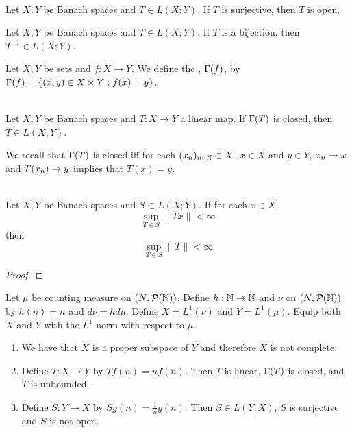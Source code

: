 \documentclass{book}
\begin{document}
	
	\begin{thm}  \\
		Let $X, Y$ be Banach spaces and $T\in L(X; Y)$. If $T$ is surjective, then $T$ is open.
	\end{thm}
	
	\begin{cor}
		Let $X, Y$ be Banach spaces and $T \in L(X; Y)$. If $T$ is a bijection, then $T^{-1} \in L(X; Y)$.
	\end{cor}
	
	\begin{defn} \ld{}
		Let $X,Y$ be sets and $f:X \rightarrow Y$. We define the , $\Gamma(f)$, by $\Gamma(f) = \{(x,y) \in X \times Y: f(x) = y\}$.
	\end{defn}
	
	\begin{thm}  \\		
		Let $X, Y$ be Banach spaces and $T:X \rightarrow Y$ a linear map. If $\Gamma(T)$ is closed, then $T \in L(X; Y)$.  
	\end{thm}
	
	\begin{note}
		We recall that $\Gamma(T)$ is closed iff for each $(x_n)_{n \in \mathbb{N}} \subset X$, $x \in X$ and $y \in Y$, $x_n \xrightarrow{} x$ and $T(x_n) \xrightarrow{} y$ implies that $T(x) = y$. 
	\end{note}
	
	\begin{ex}  \\		
		Let $X, Y$ be Banach spaces and $S \subset L(X; Y)$. If for each $x \in X$, $$\sup_{T \in S} \|Tx \|< \infty$$ then $$\sup_{T \in S} \|T \|< \infty$$
	\end{ex}

	\begin{proof}
	\end{proof}
	
	\begin{ex} \lex{}
		Let $\mu$ be counting measure on $(N, \mathcal{P}(\mathbb{N}))$. Define $h: \mathbb{N} \rightarrow \mathbb{N}$ and $ \nu$ on $(N, \mathcal{P}(\mathbb{N}))$ by $h(n) = n$ and $d \nu = h d \mu$. Define $X=L^1(\nu)$ and $Y = L^1(\mu)$. Equip both $X$ and $Y$ with the $L^1$ norm with respect to $\mu$. 
		\begin{enumerate}
			\item We have that $X$ is a proper subspace of $Y$ and therefore $X$ is not complete.
			\item Define $T: X \rightarrow Y$ by $Tf(n) = nf(n)$. Then $T$ is linear, $\Gamma(T)$ is closed, and $T$ is unbounded.
			\item Define $S:Y \rightarrow X$ by $Sg(n) = \frac{1}{n}g(n)$. Then $S \in L(Y,X)$, $S$ is surjective and $S$ is not open. 
		\end{enumerate}
	\end{ex}
	
\end{document}
